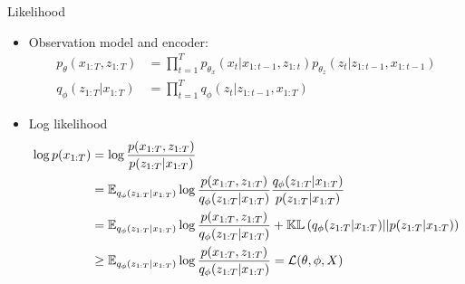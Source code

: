 \begin{frame}{Likelihood}
    \begin{itemize}
        \item <1-> Observation model and encoder:
        \begin{align}
            p_{\theta}(x_{1:T}, z_{1:T}) &= \prod_{t=1}^T p_{\theta_x}(x_t \vert x_{1:t-1}, z_{1:t}) p_{\theta_z}(z_t \vert z_{1:t-1}, x_{1:t-1}) \\
            \label{q_phi_dev}
            q_\phi(z_{1:T} \vert x_{1:T}) &= \prod_{t=1}^T q_\phi (z_t \vert z_{1:t-1}, x_{1:T})
        \end{align}
        \item <2-> Log likelihood
        \begin{align}
            \log{p(x_{1:T})} &= \log{\frac{p(x_{1:T}, z_{1:T})}{p(z_{1:T} \vert x_{1:T})}} \\
            &= \mathbb{E}_{q_{\phi}(z_{1:T}\vert x_{1:T})} \log{\frac{p(x_{1:T}, z_{1:T})}{q_{\phi}(z_{1:T}\vert x_{1:T})} \frac{q_{\phi}(z_{1:T}\vert x_{1:T})}{p(z_{1:T} \vert x_{1:T})}} \\
            &= \mathbb{E}_{q_{\phi}(z_{1:T}\vert x_{1:T})} \log{\frac{p(x_{1:T}, z_{1:T})}{q_{\phi}(z_{1:T}\vert x_{1:T})} + \mathbb{KL}\left( q_{\phi}(z_{1:T}\vert x_{1:T}) \vert\vert p(z_{1:T} \vert x_{1:T}) \right)} \\
            &\geq \mathbb{E}_{q_{\phi}(z_{1:T}\vert x_{1:T})} \log{\frac{p(x_{1:T}, z_{1:T})}{q_{\phi}(z_{1:T}\vert x_{1:T})}} = \mathcal{L}(\theta, \phi, X)
        \end{align}
    \end{itemize}
\end{frame}

